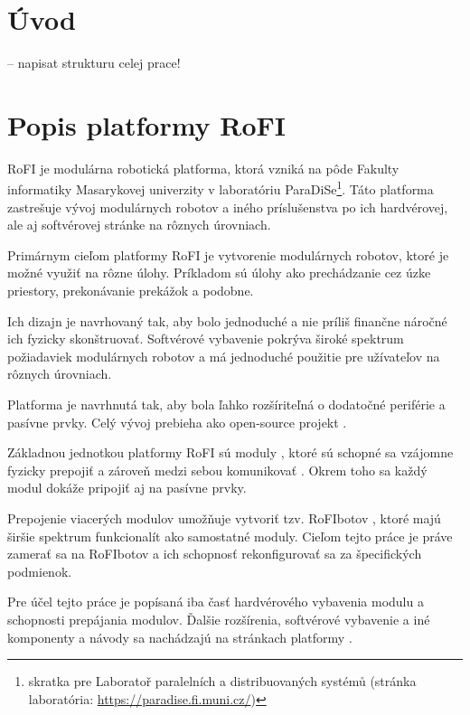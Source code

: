 \documentclass[
  digital, %
  oneside, %
  notable,   %
  lof,     %
  nolot,     %
]{fithesis3}
\begin{document}
\chapter*{Úvod}
-- napisat strukturu celej prace!

\chapter{Popis platformy RoFI}
\label{sec:platform}
RoFI je modulárna robotická platforma, ktorá vzniká na pôde Fakulty informatiky Masarykovej univerzity v laboratóriu ParaDiSe\footnote{skratka pre Laboratoř paralelních a distribuovaných systémů (stránka laboratória: \url{https://paradise.fi.muni.cz/})}. Táto platforma zastrešuje vývoj modulárnych robotov a iného príslušenstva po ich hardvérovej, ale aj softvérovej stránke na rôznych úrovniach. 

Primárnym cieľom platformy RoFI je vytvorenie modulárnych robotov, ktoré je možné využiť na rôzne úlohy. Príkladom sú úlohy ako prechádzanie cez úzke priestory, prekonávanie prekážok a podobne. 

Ich dizajn je navrhovaný tak, aby bolo jednoduché a nie príliš finančne náročné ich fyzicky skonštruovať. Softvérové vybavenie pokrýva široké spektrum požiadaviek modulárnych robotov a má jednoduché použitie pre užívateľov na rôznych úrovniach. 

Platforma je navrhnutá tak, aby bola ľahko rozšíriteľná o dodatočné periférie a pasívne prvky. Celý vývoj prebieha ako open-source projekt \cite{rofiGit}. 

Základnou jednotkou platformy RoFI sú moduly \cite{mrazekMasterThesis}, ktoré sú schopné sa vzájomne fyzicky prepojiť a zároveň medzi sebou komunikovať \cite{rofiCom}. Okrem toho sa každý modul dokáže pripojiť aj na pasívne prvky. 

Prepojenie viacerých modulov umožňuje vytvoriť tzv. RoFIbotov \cite{rofiWeb}, ktoré majú širšie spektrum funkcionalít ako samostatné moduly. Cieľom tejto práce je práve zamerať sa na RoFIbotov a ich schopnosť rekonfigurovať sa za špecifických podmienok. 

Pre účel tejto práce je popísaná iba časť hardvérového vybavenia modulu a schopnosti prepájania modulov. Ďalšie rozšírenia, softvérové vybavenie a iné komponenty a návody sa nachádzajú na stránkach platformy \cite{rofiWeb}.
\end{document}
